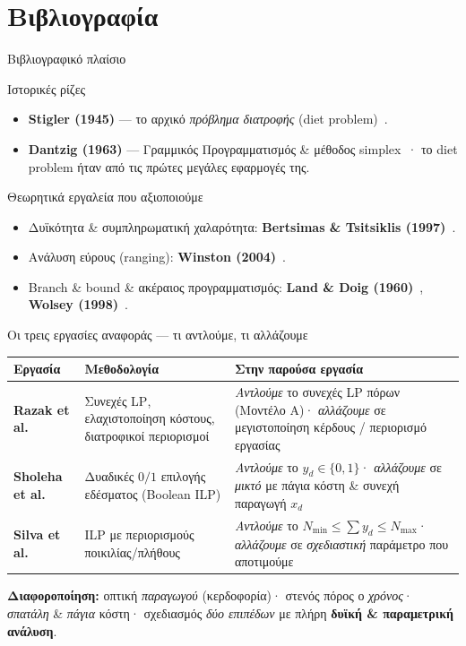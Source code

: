 \documentclass[aspectratio=169,11pt]{beamer}
\newcommand{\en}[1]{\textenglish{#1}}
\begin{document}
\section{Βιβλιογραφία}
\begin{frame}{Βιβλιογραφικό πλαίσιο}
  \begin{block}{Ιστορικές ρίζες}
    \begin{itemize}
      \item \textbf{\en{Stigler} (1945)} --- το αρχικό \emph{πρόβλημα διατροφής}
        (\en{diet problem})~\cite{stigler}.
      \item \textbf{\en{Dantzig} (1963)} --- Γραμμικός Προγραμματισμός \& μέθοδος
        \en{simplex}~\cite{dantzig}· το \en{diet problem} ήταν από τις πρώτες
        μεγάλες εφαρμογές της.
    \end{itemize}
  \end{block}
  \begin{block}{Θεωρητικά εργαλεία που αξιοποιούμε}
    \begin{itemize}
      \item Δυϊκότητα \& συμπληρωματική χαλαρότητα: \textbf{\en{Bertsimas \&
        Tsitsiklis} (1997)}~\cite{bertsimas}.
      \item Ανάλυση εύρους (\en{ranging}): \textbf{\en{Winston} (2004)}~\cite{winston}.
      \item \en{Branch \& bound} \& ακέραιος προγραμματισμός: \textbf{\en{Land \&
        Doig} (1960)}~\cite{landdoig}, \textbf{\en{Wolsey} (1998)}~\cite{wolsey}.
    \end{itemize}
  \end{block}
\end{frame}

\begin{frame}{Οι τρεις εργασίες αναφοράς --- τι αντλούμε, τι αλλάζουμε}
  \scriptsize
  \begin{tabular}{@{}p{2.6cm}p{4.2cm}p{5.4cm}@{}}
    \toprule
    \textbf{Εργασία} & \textbf{Μεθοδολογία} & \textbf{Στην παρούσα εργασία}\\
    \midrule
    \textbf{\en{Razak et al.}}~\cite{razak} & Συνεχές \en{LP}, ελαχιστοποίηση
      κόστους, διατροφικοί περιορισμοί & \emph{Αντλούμε} το συνεχές \en{LP} πόρων
      (Μοντέλο Α)· \emph{αλλάζουμε} σε μεγιστοποίηση κέρδους / περιορισμό εργασίας\\
    \addlinespace
    \textbf{\en{Sholeha et al.}}~\cite{sholeha} & Δυαδικές $0/1$ επιλογής εδέσματος
      (\en{Boolean ILP}) & \emph{Αντλούμε} το $y_d\in\{0,1\}$· \emph{αλλάζουμε} σε
      \emph{μικτό} με πάγια κόστη \& συνεχή παραγωγή $x_d$\\
    \addlinespace
    \textbf{\en{Silva et al.}}~\cite{silva} & \en{ILP} με περιορισμούς
      ποικιλίας/πλήθους & \emph{Αντλούμε} το $N_{\min}\le\sum y_d\le N_{\max}$·
      \emph{αλλάζουμε} σε \emph{σχεδιαστική} παράμετρο που αποτιμούμε\\
    \bottomrule
  \end{tabular}
  \vfill
  \footnotesize\textbf{Διαφοροποίηση:} οπτική \emph{παραγωγού} (κερδοφορία)· στενός
  πόρος ο \emph{χρόνος}· \emph{σπατάλη} \& \emph{πάγια} κόστη· σχεδιασμός \emph{δύο
  επιπέδων} με πλήρη \textbf{δυϊκή \& παραμετρική ανάλυση}.
\end{frame}
\end{document}
